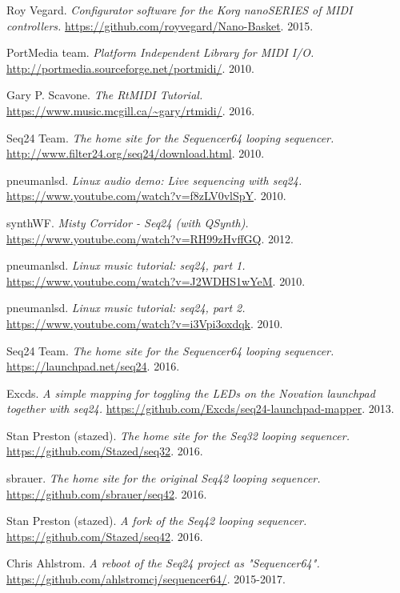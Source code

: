 \begin{thebibliography}{99}
   Roy Vegard.
   \emph{Configurator software for the Korg nanoSERIES of MIDI controllers.}
   \url{https://github.com/royvegard/Nano-Basket}.
   2015.

   PortMedia team.
   \emph{Platform Independent Library for MIDI I/O.}
   \url{http://portmedia.sourceforge.net/portmidi/}.
   2010.

   Gary P. Scavone.
   \emph{The RtMIDI Tutorial.}
   \url{https://www.music.mcgill.ca/~gary/rtmidi/}.
   2016.

   Seq24 Team.
   \emph{The home site for the Sequencer64 looping sequencer.}
   \url{http://www.filter24.org/seq24/download.html}.
   2010.

   pneumanlsd.
   \emph{Linux audio demo: Live sequencing with seq24.}
   \url{https://www.youtube.com/watch?v=f8zLV0vlSpY}.
   2010.

   synthWF.
   \emph{Misty Corridor - Seq24 (with QSynth).}
   \url{https://www.youtube.com/watch?v=RH99zHvffGQ}.
   2012.

   pneumanlsd.
   \emph{Linux music tutorial: seq24, part 1.}
   \url{https://www.youtube.com/watch?v=J2WDHS1wYeM}.
   2010.
   
   pneumanlsd.
   \emph{Linux music tutorial: seq24, part 2.}
   \url{https://www.youtube.com/watch?v=i3Vpi3oxdqk}.
   2010.

   Seq24 Team.
   \emph{The home site for the Sequencer64 looping sequencer.}
   \url{https://launchpad.net/seq24}.
   2016.

   Excds.
   \emph{A simple mapping for toggling the LEDs on the Novation launchpad
   together with seq24.}
   \url{https://github.com/Excds/seq24-launchpad-mapper}.
   2013.

   Stan Preston (stazed).
   \emph{The home site for the Seq32 looping sequencer.}
   \url{https://github.com/Stazed/seq32}.
   2016.

   sbrauer.
   \emph{The home site for the original Seq42 looping sequencer.}
   \url{https://github.com/sbrauer/seq42}.
   2016.

   Stan Preston (stazed).
   \emph{A fork of the Seq42 looping sequencer.}
   \url{https://github.com/Stazed/seq42}.
   2016.

   Chris Ahlstrom.
   \emph{A reboot of the Seq24 project as "Sequencer64".}
   \url{https://github.com/ahlstromcj/sequencer64/}.
   2015-2017.


\end{thebibliography}
